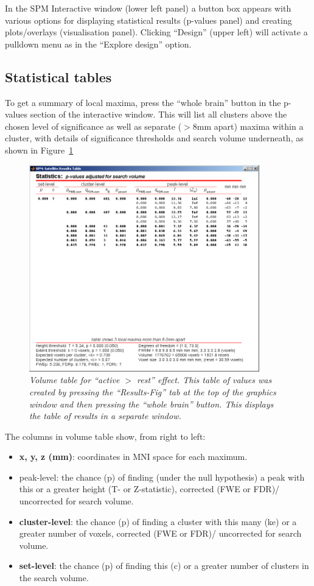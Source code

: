 In the SPM Interactive window (lower left panel) a button box appears with various options for displaying statistical results (p-values panel) and creating plots/overlays (visualisation panel). Clicking ``Design'' (upper left) will activate a pulldown menu as in the ``Explore design'' option.

\subsection{Statistical tables}

To get a summary of local maxima, press the ``whole brain'' button in the p-values section of the interactive window. This will list all clusters above the chosen level of significance as well as separate ($>$8mm apart) maxima within a cluster, with details of significance thresholds and search volume underneath, as shown in Figure~\ref{aud_volume}

\begin{figure}
\begin{center}
\includegraphics[width=100mm]{auditory/volume}
\caption{\em Volume table for ``active $>$ rest'' effect. This table of values was created by pressing the ``Results-Fig'' tab at the top of the graphics window and then pressing the ``whole brain'' button. This displays the table of results in a separate window. \label{aud_volume}}
\end{center}
\end{figure}

The columns in volume table show, from right to left:

\begin{itemize}
\item \textbf{x, y, z (mm)}: coordinates in MNI space for each maximum.
\item peak-level: the chance (p) of finding (under the null hypothesis) a peak with this or a greater height (T- or Z-statistic), corrected (FWE or FDR)/ uncorrected for search volume.
\item \textbf{cluster-level}: the chance (p) of finding a cluster with this many (ke) or a greater number of voxels, corrected (FWE or FDR)/ uncorrected for search volume.
\item \textbf{set-level}: the chance (p) of finding this (c) or a greater number of clusters in the search volume.
\end{itemize}

